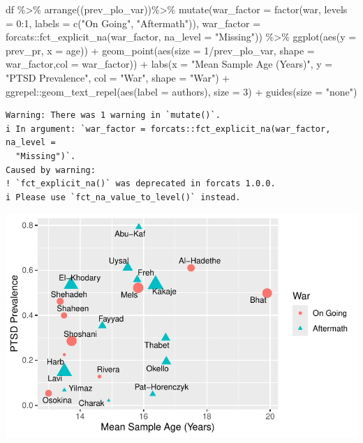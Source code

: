 \documentclass[
  letterpaper,
  DIV=11,
  numbers=noendperiod]{scrartcl}
\newenvironment{Shaded}{\begin{snugshade}}{\end{snugshade}}
\newcommand{\AttributeTok}[1]{\textcolor[rgb]{0.40,0.45,0.13}{#1}}
\newcommand{\DecValTok}[1]{\textcolor[rgb]{0.68,0.00,0.00}{#1}}
\newcommand{\FunctionTok}[1]{\textcolor[rgb]{0.28,0.35,0.67}{#1}}
\newcommand{\NormalTok}[1]{\textcolor[rgb]{0.00,0.23,0.31}{#1}}
\newcommand{\SpecialCharTok}[1]{\textcolor[rgb]{0.37,0.37,0.37}{#1}}
\newcommand{\StringTok}[1]{\textcolor[rgb]{0.13,0.47,0.30}{#1}}
\begin{document}
\begin{Shaded}
\begin{Highlighting}[]
\NormalTok{df }\SpecialCharTok{\%\textgreater{}\%}
  \FunctionTok{arrange}\NormalTok{((prev\_plo\_var))}\SpecialCharTok{\%\textgreater{}\%}
  \FunctionTok{mutate}\NormalTok{(}\AttributeTok{war\_factor =} \FunctionTok{factor}\NormalTok{(war, }\AttributeTok{levels =} \DecValTok{0}\SpecialCharTok{:}\DecValTok{1}\NormalTok{, }\AttributeTok{labels =} \FunctionTok{c}\NormalTok{(}\StringTok{"On Going"}\NormalTok{, }\StringTok{"Aftermath"}\NormalTok{)),}
         \AttributeTok{war\_factor =}\NormalTok{ forcats}\SpecialCharTok{::}\FunctionTok{fct\_explicit\_na}\NormalTok{(war\_factor, }\AttributeTok{na\_level =} \StringTok{"Missing"}\NormalTok{)) }\SpecialCharTok{\%\textgreater{}\%}
  \FunctionTok{ggplot}\NormalTok{(}\FunctionTok{aes}\NormalTok{(}\AttributeTok{y =}\NormalTok{ prev\_pr, }\AttributeTok{x =}\NormalTok{ age)) }\SpecialCharTok{+}
  \FunctionTok{geom\_point}\NormalTok{(}\FunctionTok{aes}\NormalTok{(}\AttributeTok{size =} \DecValTok{1}\SpecialCharTok{/}\NormalTok{prev\_plo\_var, }\AttributeTok{shape =}\NormalTok{ war\_factor,}\AttributeTok{col =}\NormalTok{ war\_factor)) }\SpecialCharTok{+} 
  \FunctionTok{labs}\NormalTok{(}\AttributeTok{x =} \StringTok{"Mean Sample Age (Years)"}\NormalTok{, }\AttributeTok{y =} \StringTok{"PTSD Prevalence"}\NormalTok{,}
       \AttributeTok{col =} \StringTok{"War"}\NormalTok{, }\AttributeTok{shape =} \StringTok{"War"}\NormalTok{) }\SpecialCharTok{+}
\NormalTok{  ggrepel}\SpecialCharTok{::}\FunctionTok{geom\_text\_repel}\NormalTok{(}\FunctionTok{aes}\NormalTok{(}\AttributeTok{label =}\NormalTok{ authors), }\AttributeTok{size =} \DecValTok{3}\NormalTok{) }\SpecialCharTok{+}
  \FunctionTok{guides}\NormalTok{(}\AttributeTok{size =} \StringTok{"none"}\NormalTok{) }
\end{Highlighting}
\end{Shaded}

\begin{verbatim}
Warning: There was 1 warning in `mutate()`.
i In argument: `war_factor = forcats::fct_explicit_na(war_factor, na_level =
  "Missing")`.
Caused by warning:
! `fct_explicit_na()` was deprecated in forcats 1.0.0.
i Please use `fct_na_value_to_level()` instead.
\end{verbatim}

\includegraphics{1_descriptive_stats_files/figure-pdf/unnamed-chunk-19-1.pdf}
\end{document}
